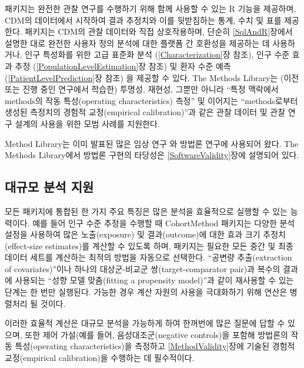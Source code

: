\documentclass[11pt]{book}
\theoremstyle{definition}
\theoremstyle{definition}
\theoremstyle{definition}
\theoremstyle{remark}
\begin{document}
패키지는 완전한 관찰 연구를 수행하기 위해 함께 사용할 수 있는 R 기능을
제공하며, CDM의 데이터에서 시작하여 결과 추정치와 이를 뒷받침하는 통계,
수치 및 표를 제공한다. 패키지는 CDM의 관찰 데이터와 직접 상호작용하며,
단순히 \ref{SqlAndR}장에서 설명한 대로 완전한 사용자 정의 분석에 대한
플랫폼 간 호환성을 제공하는 데 사용하거나, 인구 특성화를 위한 고급
표준화 분석 (\ref{Characterization}장 참조), 인구 수준 효과 추정
(\ref{PopulationLevelEstimation}장 참조) 및 환자 수준 예측
(\ref{PatientLevelPrediction}장 참조) 을 제공할 수 있다. The Methods
Library는 (이전 또는 진행 중인 연구에서 학습한) 투명성, 재현성, 그뿐만
아니라 ``특정 맥락에서 methods의 작동 특성(operating characteristics)
측정'' 및 이어지는 ``methods로부터 생성된 측정치의 경험적 교정(empirical
calibration)''과 같은 관찰 데이터 및 관찰 연구 설계의 사용을 위한 모범
사례를 지원한다.

Method Library는 이미 발표된 많은 임상 연구
\citep{boland_2017, duke_2017, ramcharran_2017, weinstein_2017, wang_2017, ryan_2017, ryan_2018, vashisht_2018, yuan_2018, johnston_2019}와
방법론 연구에 사용되어 왔다.
\citep{schuemie_2014, schuemie_2016, reps2018, tian_2018, schuemie_2018, schuemie_2018b, reps_2019}
The Methods Library에서 방법론 구현의 타당성은
\ref{SoftwareValidity}장에 설명되어 있다.

\subsection{대규모 분석 지원}\label{--}

모든 패키지에 통합된 한 가지 주요 특징은 많은 분석을 효율적으로 실행할
수 있는 능력이다. 예를 들어 인구 수준 추정을 수행할 때 CohortMethod
패키지는 다양한 분석 설정을 사용하여 많은 노출(exposure) 및
결과(outcome)에 대한 효과 크기 추정치(effect-size estimates)를 계산할 수
있도록 하며, 패키지는 필요한 모든 중간 및 최종 데이터 세트를 계산하는
최적의 방법을 자동으로 선택한다. ``공변량 추출(extraction of
covariates)''이나 하나의 대상군-비교군 쌍(target-comparator pair)과
복수의 결과에 사용되는 ``성향 모델 맞춤(fitting a propensity model)''과
같이 재사용할 수 있는 단계는 한 번만 실행된다. 가능한 경우 계산 자원의
사용을 극대화하기 위해 연산은 병렬처리 될 것이다.

이러한 효율적 계산은 대규모 분석을 가능하게 하여 한꺼번에 많은 질문에
답할 수 있으며, 또한 제어 가설(예를 들어, 음성대조군(negative
controls)을 포함해 방법론의 작동 특성(operating characteristics)을
측정하고 \ref{MethodValidity}장에 기술된 경험적 교정(empirical
calibration)을 수행하는 데 필수적이다. 
\end{document}
